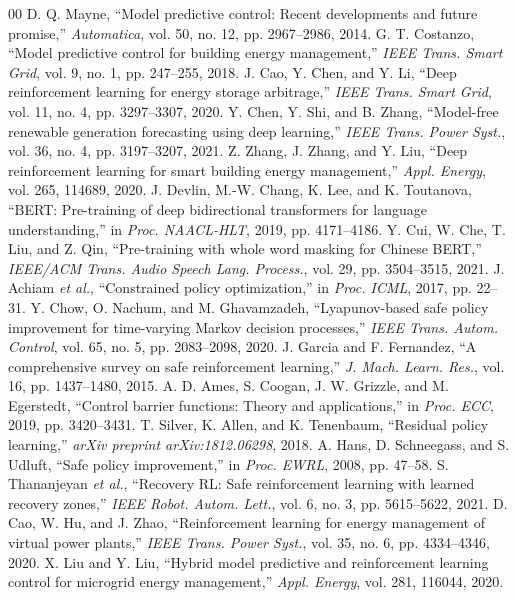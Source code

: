 \documentclass{ieeeaccess}
\begin{document}
\begin{thebibliography}{00}
 D. Q. Mayne, ``Model predictive control: Recent developments and future promise,'' \emph{Automatica}, vol. 50, no. 12, pp. 2967--2986, 2014.
 G. T. Costanzo, ``Model predictive control for building energy management,'' \emph{IEEE Trans. Smart Grid}, vol. 9, no. 1, pp. 247--255, 2018.
 J. Cao, Y. Chen, and Y. Li, ``Deep reinforcement learning for energy storage arbitrage,'' \emph{IEEE Trans. Smart Grid}, vol. 11, no. 4, pp. 3297--3307, 2020.
 Y. Chen, Y. Shi, and B. Zhang, ``Model-free renewable generation forecasting using deep learning,'' \emph{IEEE Trans. Power Syst.}, vol. 36, no. 4, pp. 3197--3207, 2021.
 Z. Zhang, J. Zhang, and Y. Liu, ``Deep reinforcement learning for smart building energy management,'' \emph{Appl. Energy}, vol. 265, 114689, 2020.
 J. Devlin, M.-W. Chang, K. Lee, and K. Toutanova, ``BERT: Pre-training of deep bidirectional transformers for language understanding,'' in \emph{Proc. NAACL-HLT}, 2019, pp. 4171--4186.
 Y. Cui, W. Che, T. Liu, and Z. Qin, ``Pre-training with whole word masking for Chinese BERT,'' \emph{IEEE/ACM Trans. Audio Speech Lang. Process.}, vol. 29, pp. 3504--3515, 2021.
 J. Achiam \emph{et al.}, ``Constrained policy optimization,'' in \emph{Proc. ICML}, 2017, pp. 22--31.
 Y. Chow, O. Nachum, and M. Ghavamzadeh, ``Lyapunov-based safe policy improvement for time-varying Markov decision processes,'' \emph{IEEE Trans. Autom. Control}, vol. 65, no. 5, pp. 2083--2098, 2020.
 J. Garcia and F. Fernandez, ``A comprehensive survey on safe reinforcement learning,'' \emph{J. Mach. Learn. Res.}, vol. 16, pp. 1437--1480, 2015.
 A. D. Ames, S. Coogan, J. W. Grizzle, and M. Egerstedt, ``Control barrier functions: Theory and applications,'' in \emph{Proc. ECC}, 2019, pp. 3420--3431.
 T. Silver, K. Allen, and K. Tenenbaum, ``Residual policy learning,'' \emph{arXiv preprint arXiv:1812.06298}, 2018.
 A. Hans, D. Schneegass, and S. Udluft, ``Safe policy improvement,'' in \emph{Proc. EWRL}, 2008, pp. 47--58.
 S. Thananjeyan \emph{et al.}, ``Recovery RL: Safe reinforcement learning with learned recovery zones,'' \emph{IEEE Robot. Autom. Lett.}, vol. 6, no. 3, pp. 5615--5622, 2021.
 D. Cao, W. Hu, and J. Zhao, ``Reinforcement learning for energy management of virtual power plants,'' \emph{IEEE Trans. Power Syst.}, vol. 35, no. 6, pp. 4334--4346, 2020.
 X. Liu and Y. Liu, ``Hybrid model predictive and reinforcement learning control for microgrid energy management,'' \emph{Appl. Energy}, vol. 281, 116044, 2020.

\end{thebibliography}
\end{document}
